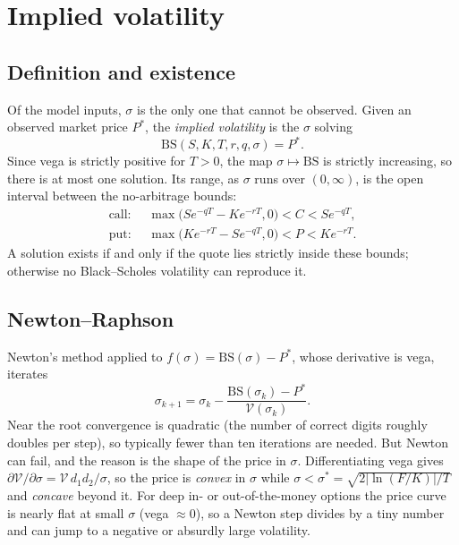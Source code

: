 \documentclass[11pt,a4paper]{article}
\theoremstyle{plain}
\theoremstyle{remark}
\begin{document}
\section{Implied volatility}\label{sec:iv}

\subsection{Definition and existence}

Of the model inputs, $\sigma$ is the only one that cannot be observed. Given an
observed market price $P^\ast$, the \emph{implied volatility} is the $\sigma$ solving
\begin{equation}\label{eq:iv}
\mathrm{BS}(S,K,T,r,q,\sigma)=P^\ast .
\end{equation}
Since vega is strictly positive for $T>0$, the map $\sigma\mapsto\mathrm{BS}$ is
strictly increasing, so there is at most one solution. Its range, as $\sigma$ runs over
$(0,\infty)$, is the open interval between the no-arbitrage bounds:
\[
\begin{aligned}
\text{call: }&\ \max\!\big(Se^{-qT}-Ke^{-rT},0\big)<C<Se^{-qT},\\
\text{put: }&\ \max\!\big(Ke^{-rT}-Se^{-qT},0\big)<P<Ke^{-rT}.
\end{aligned}
\]
A solution exists if and only if the quote lies strictly inside these bounds; otherwise no
Black--Scholes volatility can reproduce it.

\subsection{Newton--Raphson}

Newton's method applied to $f(\sigma)=\mathrm{BS}(\sigma)-P^\ast$, whose derivative is vega, iterates
\begin{equation}\label{eq:newton}
\sigma_{k+1}=\sigma_k-\frac{\mathrm{BS}(\sigma_k)-P^\ast}{\mathcal V(\sigma_k)} .
\end{equation}
Near the root convergence is quadratic (the number of correct digits roughly doubles per step),
so typically fewer than ten iterations are needed. But Newton can fail, and the reason
is the shape of the price in $\sigma$. Differentiating vega gives $\partial\mathcal V/\partial\sigma=\mathcal V\,d_1d_2/\sigma$, so the
price is \emph{convex} in $\sigma$ while $\sigma<\sigma^\ast=\sqrt{2|\ln(F/K)|/T}$ and \emph{concave} beyond it. For
deep in- or out-of-the-money options the price curve is nearly flat at small $\sigma$ (vega $\approx0$), so a Newton
step divides by a tiny number and can jump to a negative or absurdly large volatility.
\end{document}
